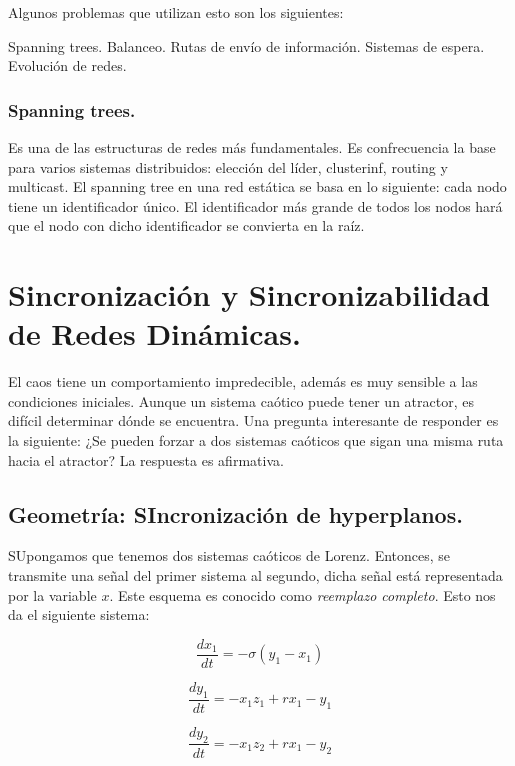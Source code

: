 \documentclass{llncs}
\theoremstyle{plane}
\begin{document}
Algunos problemas que utilizan esto son los siguientes:

Spanning trees. Balanceo. Rutas de envío de información. Sistemas de espera.
Evolución de redes.

\subsubsection{Spanning trees.} Es una de las estructuras de redes más fundamentales.
Es confrecuencia la base para varios sistemas distribuidos: elección del líder, clusterinf, routing y multicast.  El spanning tree en una red estática se basa en lo siguiente: cada nodo tiene un identificador único. El identificador más grande de todos los nodos hará que el nodo con dicho identificador se convierta en la raíz. 

\section{Sincronización y Sincronizabilidad de Redes Dinámicas.}

El caos tiene un comportamiento impredecible, además es muy sensible a las condiciones iniciales. Aunque un sistema caótico puede tener un atractor, es difícil determinar dónde se encuentra.
Una pregunta interesante de responder es la siguiente: ¿Se pueden forzar a dos sistemas caóticos que sigan una misma ruta hacia el atractor? La respuesta es afirmativa.


\subsection{Geometría: SIncronización de hyperplanos.}
SUpongamos que tenemos dos sistemas caóticos de Lorenz. Entonces, se transmite una señal del primer sistema al segundo, dicha señal está representada por la variable $x$. Este esquema es conocido como \textit{reemplazo completo}. Esto nos da el siguiente sistema:

\begin{equation}
\frac{d x_{1}}{dt}=  -\sigma(y_{1}-x_{1})
\end{equation}


\begin{equation}
\frac{d y_{1}}{dt}=  -x_{1}z_{1}+ rx_{1}- y_{1}
\end{equation}



\begin{equation}
\frac{d y_{2}}{dt}=  -x_{1}z_{2}+ rx_{1}- y_{2}
\end{equation}
\end{document}
